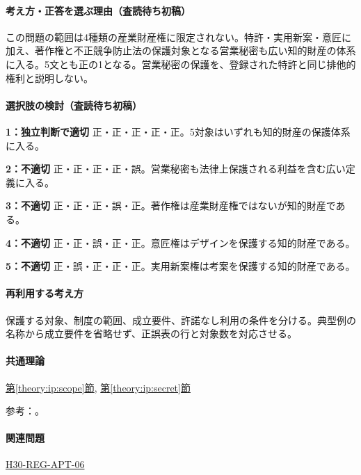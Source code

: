 \paragraph{考え方・正答を選ぶ理由（査読待ち初稿）} この問題の範囲は4種類の産業財産権に限定されない。特許・実用新案・意匠に加え、著作権と不正競争防止法の保護対象となる営業秘密も広い知的財産の体系に入る。5文とも正の1となる。営業秘密の保護を、登録された特許と同じ排他的権利と説明しない。

\paragraph{選択肢の検討（査読待ち初稿）}\mbox{}\par

\noindent\textbf{1：独立判断で適切} 正・正・正・正・正。5対象はいずれも知的財産の保護体系に入る。\par

\noindent\textbf{2：不適切} 正・正・正・正・誤。営業秘密も法律上保護される利益を含む広い定義に入る。\par

\noindent\textbf{3：不適切} 正・正・正・誤・正。著作権は産業財産権ではないが知的財産である。\par

\noindent\textbf{4：不適切} 正・正・誤・正・正。意匠権はデザインを保護する知的財産である。\par

\noindent\textbf{5：不適切} 正・誤・正・正・正。実用新案権は考案を保護する知的財産である。\par

\paragraph{再利用する考え方} 保護する対象、制度の範囲、成立要件、許諾なし利用の条件を分ける。典型例の名称から成立要件を省略せず、正誤表の行と対象数を対応させる。

\paragraph{共通理論} \hyperref[theory:ip:scope]{第\ref*{theory:ip:scope}節}, \hyperref[theory:ip:secret]{第\ref*{theory:ip:secret}節}

\par 参考：\cite{ip_basic_act,ip_broad_scope}。

\paragraph{関連問題} \hyperref[q:h30-reg-apt-06]{H30-REG-APT-06}

